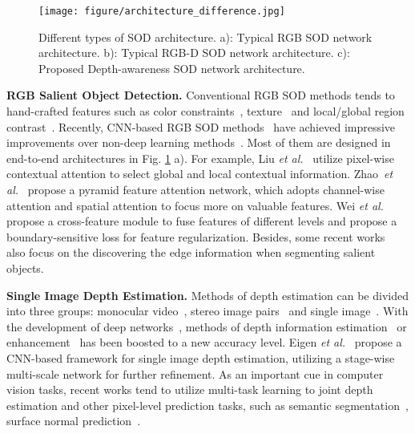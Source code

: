 \documentclass[journal]{IEEEtran}
\def\etal{{\em et al.}}
\newcommand{\figref}[1]{Fig. \ref{#1}}
\begin{document}
\begin{figure}
	\begin{center}
\texttt{[image: figure/architecture\_difference.jpg]}
		\caption{Different types of SOD architecture. a): Typical RGB SOD network architecture. b): Typical RGB-D SOD network architecture. c): Proposed Depth-awareness SOD network architecture.
		}\label{fig:introduction}
	\end{center}
\end{figure}


\textbf{RGB Salient Object Detection.}
Conventional RGB SOD methods tends to hand-crafted features such as color constraints~\cite{cheng2014global}, texture~\cite{yan2013hierarchical} and local/global region contrast~\cite{klein2011center}.
Recently, CNN-based RGB SOD methods~\cite{liu2018picanet,li2019constrained,wu2019cascaded,li2021salient,zhao2019pyramid,su2019selectivity,qin2019basnet,F3Net,li2020parallel,ma2021pyramidal} have achieved impressive improvements over non-deep learning methods~\cite{cheng2014global,yan2013hierarchical,klein2011center}. Most of them are designed in end-to-end architectures in \figref{fig:introduction} a).
For example, Liu \etal~\cite{liu2018picanet} utilize pixel-wise contextual attention to select global and local contextual information. Zhao~\etal~\cite{zhao2019pyramid} propose a pyramid feature attention network, which adopts channel-wise attention and spatial attention to focus more on valuable features. Wei \etal~\cite{F3Net} propose a cross-feature module to fuse features of different levels and propose a boundary-sensitive loss for feature regularization.  Besides, some recent works~\cite{li2020personal,qin2019basnet,zhao2019egnet} also focus on the discovering the edge information when segmenting salient objects.





\textbf{Single Image Depth Estimation.}
 Methods of depth estimation can be divided into three groups: monocular video~\cite{wang2018learning}, stereo image pairs~\cite{garg2016unsupervised} and single image~\cite{eigen2014depth,eigen2015predicting,laina2016deeper,fu2018deep,yin2019enforcing}.  With the development of deep networks~\cite{simonyan2014very,he2016deep}, methods of depth information estimation~\cite{eigen2014depth,eigen2015predicting,laina2016deeper} or enhancement~\cite{he2021towards} has been boosted to a new accuracy level.
Eigen \etal~\cite{eigen2014depth,eigen2015predicting} propose a CNN-based framework for single image depth estimation, utilizing a stage-wise multi-scale network for further refinement.
As an important cue in computer vision tasks, recent works tend to utilize multi-task learning to joint depth estimation and other pixel-level prediction tasks, such as semantic segmentation~\cite{mousavian2016joint}, surface normal prediction~\cite{yin2019enforcing}.
\end{document}

